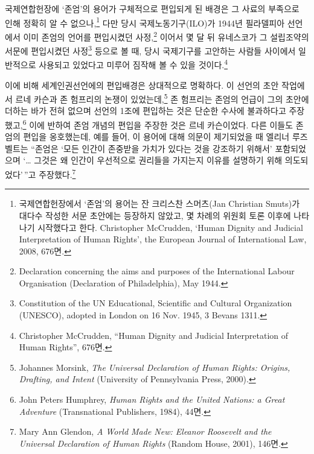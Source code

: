 국제연합헌장에 `존엄'의 용어가 구체적으로 편입되게 된 배경은 그 사료의 부족으로 인해 정확히 알 수 없으나,\footnote{국제연합헌장에서 `존엄'의 용어는 잔 크리스찬 스머츠(Jan Christian Smuts)가 대다수 작성한 서문 초안에는 등장하지 않았고, 몇 차례의 위원회 토론 이후에 나타나기 시작했다고 한다. Christopher McCrudden, `Human Dignity and Judicial Interpretation of Human Rights', the European Journal of International Law, 2008, 676면.} 다만 당시 국제노동기구(ILO)가 1944년 필라델피아 선언에서 이미 존엄의 언어를 편입시켰던 사정,\footnote{Declaration concerning the aims and purposes of the International Labour Organisation (Declaration of Philadelphia), May 1944.} 이어서 몇 달 뒤 유네스코가 그 설립조약의 서문에 편입시켰던 사정\footnote{Constitution of the UN Educational, Scientific and Cultural Organization (UNESCO), adopted in London on 16 Nov. 1945, 3 Bevans 1311.} 등으로 볼 때, 당시 국제기구를 고안하는 사람들 사이에서 일반적으로 사용되고 있었다고 미루어 짐작해 볼 수 있을 것이다.\footnote{Christopher McCrudden, ``Human Dignity and Judicial Interpretation of Human Rights'', 676면.}

이에 비해 세계인권선언에의 편입배경은 상대적으로 명확하다. 이 선언의 초안 작업에서 르네 카슨과 존 험프리의 논쟁이 있었는데,\footnote{Johannes Morsink, \emph{The Universal Declaration of Human Rights: Origins, Drafting, and Intent} (University of Pennsylvania Press, 2000).} 존 험프리는 존엄의 언급이 그의 초안에 더하는 바가 전혀 없으며 선언의 1조에 편입하는 것은 단순한 수사에 불과하다고 주장했고,\footnote{John Peters Humphrey, \emph{Human Rights and the United Nations: a Great Adventure} (Transnational Publishers, 1984), 44면.} 이에 반하여 존엄 개념의 편입을 주장한 것은 르네 카슨이었다. 다른 이들도 존엄의 편입을 옹호했는데, 예를 들어, 이 용어에 대해 의문이 제기되었을 때 엘리너 루즈벨트는 ``존엄은 `모든 인간이 존중받을 가치가 있다는 것을 강조하기 위해서' 포함되었으며 `\ldots{} 그것은 왜 인간이 우선적으로 권리들을 가지는지 이유를 설명하기 위해 의도되었다'\,''고 주장했다.\footnote{Mary Ann Glendon, \emph{A World Made New: Eleanor Roosevelt and the Universal Declaration of Human Rights} (Random House, 2001), 146면.}

